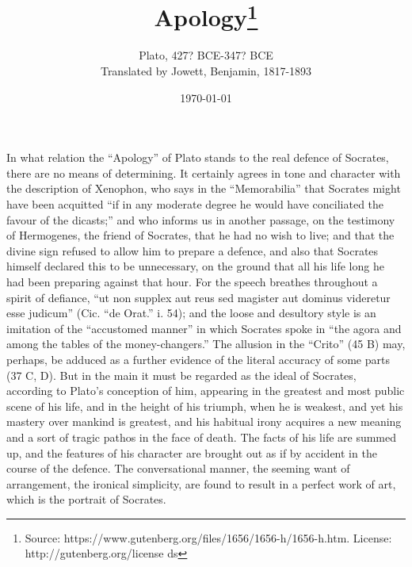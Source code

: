 \documentclass[11pt,letter]{article}
\begin{document}
\title{Apology\thanks{Source: https://www.gutenberg.org/files/1656/1656-h/1656-h.htm. License: http://gutenberg.org/license ds}}
\date{\today}
\author{Plato, 427? BCE-347? BCE\\ Translated by Jowett, Benjamin, 1817-1893}
\maketitle

\setcounter{tocdepth}{1}
\tableofcontents
\renewcommand{\baselinestretch}{1.0}
\normalsize
\newpage


\par  In what relation the “Apology” of Plato stands to the real defence of Socrates, there are no means of determining. It certainly agrees in tone and character with the description of Xenophon, who says in the “Memorabilia” that Socrates might have been acquitted “if in any moderate degree he would have conciliated the favour of the dicasts;” and who informs us in another passage, on the testimony of Hermogenes, the friend of Socrates, that he had no wish to live; and that the divine sign refused to allow him to prepare a defence, and also that Socrates himself declared this to be unnecessary, on the ground that all his life long he had been preparing against that hour. For the speech breathes throughout a spirit of defiance, “ut non supplex aut reus sed magister aut dominus videretur esse judicum” (Cic. “de Orat.” i. 54); and the loose and desultory style is an imitation of the “accustomed manner” in which Socrates spoke in “the agora and among the tables of the money-changers.” The allusion in the “Crito” (45 B) may, perhaps, be adduced as a further evidence of the literal accuracy of some parts (37 C, D). But in the main it must be regarded as the ideal of Socrates, according to Plato’s conception of him, appearing in the greatest and most public scene of his life, and in the height of his triumph, when he is weakest, and yet his mastery over mankind is greatest, and his habitual irony acquires a new meaning and a sort of tragic pathos in the face of death. The facts of his life are summed up, and the features of his character are brought out as if by accident in the course of the defence. The conversational manner, the seeming want of arrangement, the ironical simplicity, are found to result in a perfect work of art, which is the portrait of Socrates.
\end{document}
